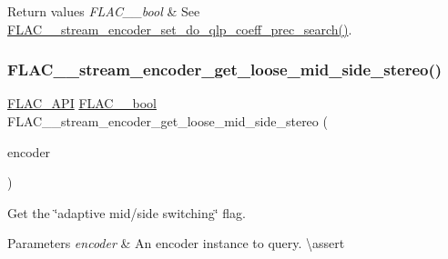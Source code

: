 \begin{DoxyRetVals}{Return values}
{\em F\+L\+A\+C\+\_\+\+\_\+bool} & See \mbox{\hyperlink{group__flac__stream__encoder_ga3aa94a1aec1cf40c37e54434c86bb50d}{F\+L\+A\+C\+\_\+\+\_\+stream\+\_\+encoder\+\_\+set\+\_\+do\+\_\+qlp\+\_\+coeff\+\_\+prec\+\_\+search()}}. \\
\hline
\end{DoxyRetVals}
\mbox{\label{group__flac__stream__encoder_ga539ac36925671ac84371a745f8acce17}} 
\subsubsection{\texorpdfstring{FLAC\_\_stream\_encoder\_get\_loose\_mid\_side\_stereo()}{FLAC\_\_stream\_encoder\_get\_loose\_mid\_side\_stereo()}}
{\footnotesize\ttfamily \mbox{\hyperlink{group__flac__export_ga56ca07df8a23310707732b1c0007d6f5}{F\+L\+A\+C\+\_\+\+A\+PI}} \mbox{\hyperlink{ordinals_8h_a95103469f1cbd78b8cf250194985b34e}{F\+L\+A\+C\+\_\+\+\_\+bool}} F\+L\+A\+C\+\_\+\+\_\+stream\+\_\+encoder\+\_\+get\+\_\+loose\+\_\+mid\+\_\+side\+\_\+stereo (\begin{DoxyParamCaption}\item[{const \mbox{\hyperlink{struct_f_l_a_c_____stream_encoder}{F\+L\+A\+C\+\_\+\+\_\+\+Stream\+Encoder}} $\ast$}]{encoder }\end{DoxyParamCaption})}

Get the \char`\"{}adaptive mid/side switching\char`\"{} flag.


\begin{DoxyParams}{Parameters}
{\em encoder} & An encoder instance to query. \textbackslash{}assert 
\begin{DoxyCode}{1}
\end{DoxyCode}
 \\
\hline
\end{DoxyParams}

